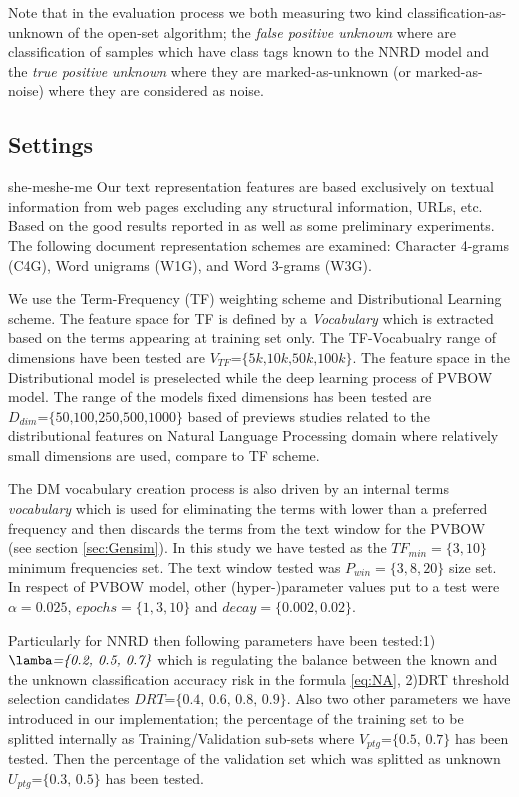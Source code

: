 \documentclass[runningheads]{llncs}
\begin{document}
Note that in the evaluation process we both measuring two kind classification-as-unknown of the open-set algorithm; the \textit{false positive unknown} where are classification of samples which have class tags known to the NNRD model and the \textit{true positive unknown} where they are marked-as-unknown (or marked-as-noise) where they are considered as noise.

\subsection{Settings}\label{sec:evaluation_measures}
she-meshe-me
Our text representation features are based exclusively on textual information from web pages excluding any structural information, URLs, etc. Based on the good results reported in \citep{sharoff2010web,pritsos2013open,Asheghi2015} as well as some preliminary experiments. The following document representation schemes are examined: Character 4-grams (C4G), Word unigrams (W1G), and Word 3-grams (W3G).

We use the Term-Frequency (TF) weighting scheme and Distributional Learning scheme. The feature space for TF is defined by a \textit{Vocabulary} which is extracted based on the terms appearing at training set only. The TF-Vocabualry range of dimensions have been tested are $V_{TF}\textit{=\{5k,10k,50k,100k\}}$. The feature space in the Distributional model is preselected while the deep learning process of PVBOW model. The range of the models fixed dimensions has been tested are $D_{dim}\textit{=\{50,100,250,500,1000\}}$ based of previews studies related to the distributional features on Natural Language Processing domain where relatively small dimensions are used, compare to TF scheme.

The DM vocabulary creation process is also driven by an internal terms \textit{vocabulary} which is used for eliminating the terms with lower than a preferred frequency and then discards the terms from the text window for the PVBOW (see section \ref{sec:Gensim}). In this study we have tested as the $TF_{min}=\{3,10\}$ minimum frequencies set. The text window tested was $P_{win}=\{3,8,20\}$ size set. In respect of PVBOW model, other (hyper-)parameter values put to a test were $\alpha=0.025$, $epochs=\{1, 3, 10\}$ and $decay=\{0.002, 0.02\}$.

Particularly for NNRD then following parameters have been tested:1) $\lamba\textit{=\{0.2, 0.5, 0.7\}}$ which is regulating the balance between the known and the unknown classification accuracy risk in the formula \ref{eq:NA}, 2)DRT threshold selection candidates $DRT\textit{=\{0.4, 0.6, 0.8, 0.9\}}$. Also two other parameters we have introduced in our implementation; the percentage of the training set to be splitted internally as Training/Validation sub-sets where $V_{ptg}\textit{=\{0.5, 0.7\}}$ has been tested. Then the percentage of the validation set which was splitted as unknown $U_{ptg}\textit{=\{0.3, 0.5\}}$ has been tested.
\end{document}
